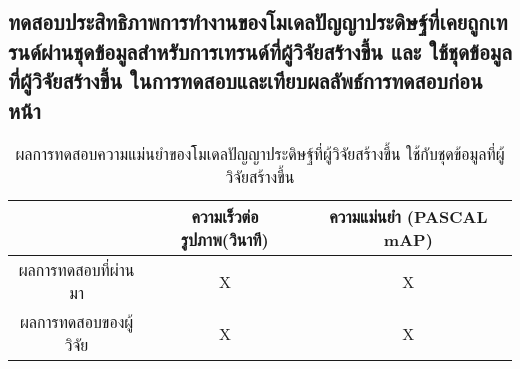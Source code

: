 \subsection{ทดสอบประสิทธิภาพการทำงานของโมเดลปัญญาประดิษฐ์ที่เคยถูกเทรนด์ผ่านชุดข้อมูลสำหรับการเทรนด์ที่ผู้วิจัยสร้างขึ้น และ ใช้ชุดข้อมูลที่ผู้วิจัยสร้างขึ้น ในการทดสอบและเทียบผลลัพธ์การทดสอบก่อนหน้า}
\begin{table}[!ht]
	\centering
	\begin{tabular}{|c|c|c|}
			\hline
			{}&{ความเร็วต่อรูปภาพ(วินาที)}&{ความแม่นยำ (PASCAL mAP)}			\\
			\hline
			ผลการทดสอบที่ผ่านมา	 				& X			& X					\\
			ผลการทดสอบของผู้วิจัย				& X			& X				\\
			\hline
	\end{tabular}
\caption{ผลการทดสอบความแม่นยำของโมเดลปัญญาประดิษฐ์ที่ผู้วิจัยสร้างขึ้น ใช้กับชุดข้อมูลที่ผู้วิจัยสร้างขึ้น}
\label{tab: Test PASCAL mAP with dataset created by the researcher}
\end{table}
